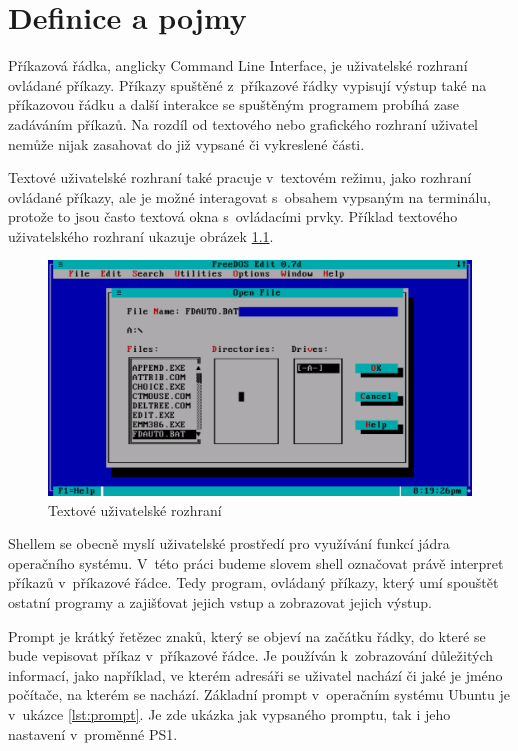 \documentclass[thesis=M,czech]{FITthesis}[2012/06/26]
\begin{document}
\chapter{Definice a pojmy}

Příkazová řádka, anglicky Command Line Interface, je uživatelské rozhraní ovládané příkazy. Příkazy spuštěné z~příkazové řádky vypisují výstup také na příkazovou řádku a další interakce se spuštěným programem probíhá zase zadáváním příkazů. Na rozdíl od textového nebo grafického rozhraní uživatel nemůže nijak zasahovat do již vypsané či vykreslené části.

Textové uživatelské rozhraní také pracuje v~textovém režimu, jako rozhraní ovládané příkazy, ale je možné interagovat s~obsahem vypsaným na terminálu, protože to jsou často textová okna s~ovládacími prvky. Příklad textového uživatelského rozhraní ukazuje obrázek \ref{fig:tui}.

\begin{figure}
	\includegraphics[width=1.0\textwidth]{./images/TUI}
	\caption{Textové uživatelské rozhraní}
	\label{fig:tui}
\end{figure}

Shellem se obecně myslí uživatelské prostředí pro využívání funkcí jádra operačního systému. V~této práci budeme slovem shell označovat právě interpret příkazů v~příkazové řádce. Tedy program, ovládaný příkazy, který umí spouštět ostatní programy a zajišťovat jejich vstup a zobrazovat jejich výstup.


Prompt je krátký řetězec znaků, který se objeví na začátku řádky, do které se bude vepisovat příkaz v~příkazové řádce. Je používán k~zobrazování důležitých informací, jako například, ve kterém adresáři se uživatel nachází či jaké je jméno počítače, na kterém se nachází. Základní prompt v~operačním systému Ubuntu \cite{ubuntu} je v~ukázce \ref{lst:prompt}. Je zde ukázka jak vypsaného promptu, tak i jeho nastavení v~proměnné PS1.
\end{document}
